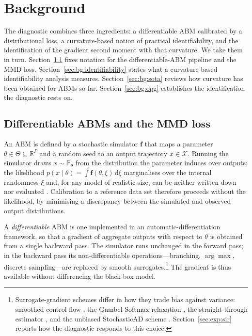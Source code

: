 \documentclass[10pt,twocolumn]{article}
\newcommand{\R}{\mathbb{R}}
\newcommand{\Prob}{\mathbb{P}}
\newcommand{\Xspace}{\mathcal{X}}
\newcommand{\Tspace}{\Theta}
\begin{document}
\section{Background}
\label{sec:background}

The diagnostic combines three ingredients: a differentiable ABM calibrated by a
distributional loss, a curvature-based notion of practical identifiability, and the
identification of the gradient second moment with that curvature. We take them in
turn. Section~\ref{sec:bg:calibration} fixes notation for the differentiable-ABM
pipeline and the MMD loss. Section~\ref{sec:bg:identifiability} states what a
curvature-based identifiability analysis measures. Section~\ref{sec:bg:sota} reviews
how curvature has been obtained for ABMs so far. Section~\ref{sec:bg:opg}
establishes the identification the diagnostic rests on.

\subsection{Differentiable ABMs and the MMD loss}
\label{sec:bg:calibration}

An ABM is defined by a stochastic simulator $\mathbf{f}$ that maps a parameter
$\theta \in \Tspace \subseteq \R^P$ and a random seed to an output trajectory
$x \in \Xspace$. Running the simulator draws $x \sim \Prob_\theta$ from the
distribution the parameter induces over outputs; the likelihood
$p(x \mid \theta) = \int \mathbf{f}(\theta,\xi)\,\mathrm{d}\xi$ marginalises over the
internal randomness $\xi$ and, for any model of realistic size, can be neither
written down nor evaluated \citep{platt2020comparison}. Calibration to a reference
data set therefore proceeds without the likelihood, by minimising a discrepancy
between the simulated and observed output distributions.

A \emph{differentiable} ABM \citep{querabofarull2025automatic, chopra2023differentiable}
is one implemented in an automatic-differentiation framework, so that a gradient of
aggregate outputs with respect to $\theta$ is obtained from a single backward pass.
The simulator runs unchanged in the forward pass; in the backward pass its
non-differentiable operations---branching, $\arg\max$, discrete sampling---are
replaced by smooth surrogates.\footnote{Surrogate-gradient schemes differ in how
they trade bias against variance: smoothed control flow
\citep{andelfinger2023towards}, the Gumbel-Softmax relaxation
\citep{jang2017categorical, maddison2017concrete}, the straight-through estimator
\citep{bengio2013estimating}, and the unbiased StochasticAD scheme
\citep{arya2022automatic}. Section~\ref{sec:exp:sir} reports how the diagnostic
responds to this choice.} The gradient is thus available without differencing the
black-box model.
\end{document}

